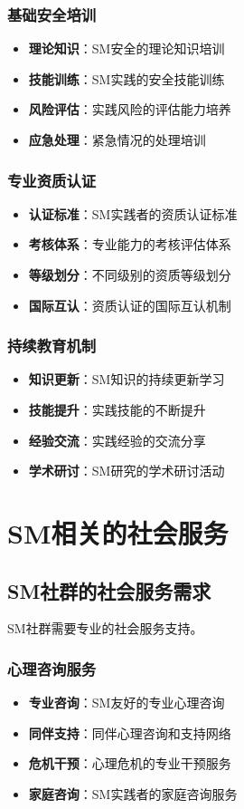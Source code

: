 \documentclass[12pt,UTF8]{ctexbook}
\begin{document}
\subsection{基础安全培训}
\begin{itemize}[leftmargin=2cm]
	\item \textbf{理论知识}：SM安全的理论知识培训
	\item \textbf{技能训练}：SM实践的安全技能训练
	\item \textbf{风险评估}：实践风险的评估能力培养
	\item \textbf{应急处理}：紧急情况的处理培训
\end{itemize}

\subsection{专业资质认证}
\begin{itemize}[leftmargin=2cm]
	\item \textbf{认证标准}：SM实践者的资质认证标准
	\item \textbf{考核体系}：专业能力的考核评估体系
	\item \textbf{等级划分}：不同级别的资质等级划分
	\item \textbf{国际互认}：资质认证的国际互认机制
\end{itemize}

\subsection{持续教育机制}
\begin{itemize}[leftmargin=2cm]
	\item \textbf{知识更新}：SM知识的持续更新学习
	\item \textbf{技能提升}：实践技能的不断提升
	\item \textbf{经验交流}：实践经验的交流分享
	\item \textbf{学术研讨}：SM研究的学术研讨活动
\end{itemize}

\chapter{SM相关的社会服务}
\section{SM社群的社会服务需求}
SM社群需要专业的社会服务支持。

\subsection{心理咨询服务}
\begin{itemize}[leftmargin=2cm]
	\item \textbf{专业咨询}：SM友好的专业心理咨询
	\item \textbf{同伴支持}：同伴心理咨询和支持网络
	\item \textbf{危机干预}：心理危机的专业干预服务
	\item \textbf{家庭咨询}：SM实践者的家庭咨询服务
\end{itemize}
\end{document}
